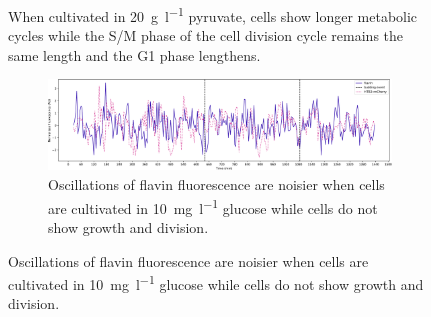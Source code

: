 \begin{figure}
  \caption{
    When cultivated in \SI{20}{\gram~\litre^{-1}} pyruvate, cells show longer metabolic cycles while the S/M phase of the cell division cycle remains the same length and the G1 phase lengthens.
  }
  \label{fig:biology-pyruvate}
\end{figure}


\begin{figure}
  \centering
  \begin{subfigure}[htpb]{0.9\textwidth}
   \centering
   \includegraphics[width=\textwidth]{limiting_single_birth_plot_edit.pdf}
   \caption{
     Oscillations of flavin fluorescence are noisier when cells are cultivated in \SI{10}{\milli\gram~\litre^{-1}} glucose while cells do not show growth and division.
   }
   \label{fig:biology-lowglc-single}
  \end{subfigure}


\end{figure}
